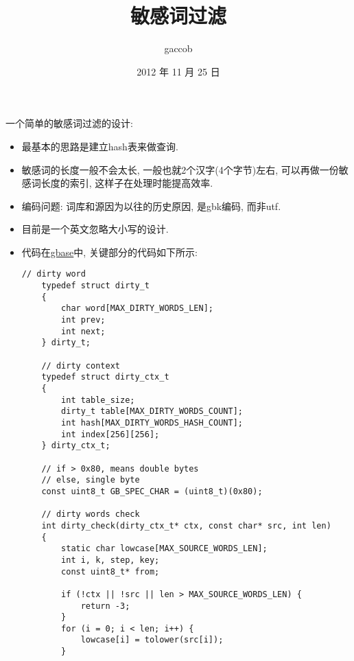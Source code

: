 

\title {\ZHH \huge 敏感词过滤}
\author {\small gaccob}
\date {\small 2012 年 11 月 25 日}
\maketitle

{\ZHH 一个简单的敏感词过滤的设计: }
\begin {itemize}
    \item { 最基本的思路是建立hash表来做查询. }
    \item { 敏感词的长度一般不会太长, 一般也就2个汉字(4个字节)左右, 可以再做一份敏感词长度的索引, 这样子在处理时能提高效率. }
    \item { 编码问题: 词库和源因为以往的历史原因, 是gbk编码, 而非utf. }
    \item { 目前是一个英文忽略大小写的设计. }
    \item { 代码在\href{https://github.com/gaccob/gbase/tree/master/logic/dirty}{gbase}中, 关键部分的代码如下所示: } \\

    \begin{lstlisting}[language={[ANSI]C}]
    // dirty word
    typedef struct dirty_t
    {
        char word[MAX_DIRTY_WORDS_LEN];
        int prev;
        int next;
    } dirty_t;

    // dirty context
    typedef struct dirty_ctx_t
    {
        int table_size;
        dirty_t table[MAX_DIRTY_WORDS_COUNT];
        int hash[MAX_DIRTY_WORDS_HASH_COUNT];
        int index[256][256];
    } dirty_ctx_t;

    // if > 0x80, means double bytes
    // else, single byte
    const uint8_t GB_SPEC_CHAR = (uint8_t)(0x80);

    // dirty words check
    int dirty_check(dirty_ctx_t* ctx, const char* src, int len)
    {
        static char lowcase[MAX_SOURCE_WORDS_LEN];
        int i, k, step, key;
        const uint8_t* from;

        if (!ctx || !src || len > MAX_SOURCE_WORDS_LEN) {
            return -3;
        }
        for (i = 0; i < len; i++) {
            lowcase[i] = tolower(src[i]);
        }


\end{lstlisting}
\end{itemize}

